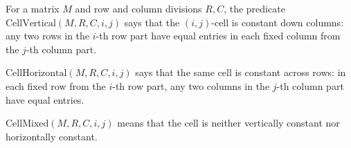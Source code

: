 For a matrix \(M\) and row and column divisions \(R,C\), the predicate
\(\mathrm{CellVertical}(M,R,C,i,j)\) says that the \((i,j)\)-cell is constant
down columns: any two rows in the \(i\)-th row part have equal entries in each
fixed column from the \(j\)-th column part.

\(\mathrm{CellHorizontal}(M,R,C,i,j)\) says that the same cell is constant
across rows: in each fixed row from the \(i\)-th row part, any two columns in
the \(j\)-th column part have equal entries.

\(\mathrm{CellMixed}(M,R,C,i,j)\) means that the cell is neither vertically
constant nor horizontally constant.
